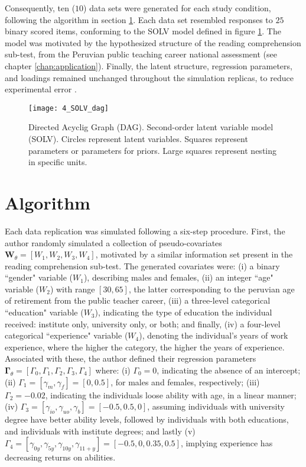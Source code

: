 Consequently, ten ($10$) data sets were generated for each study condition, following the algorithm in section \ref{sect:algorithm}. Each data set resembled responses to $25$ binary scored items, conforming to the SOLV model defined in figure \ref{fig:SOLV_model}. The model was motivated by the hypothesized structure of the reading comprehension sub-test, from the Peruvian public teaching career national assessment (see chapter \ref{chap:application}). Finally, the latent structure, regression parameters, and loadings remained unchanged throughout the simulation replicas, to reduce experimental error \cite{Kieftenbeld_et_al_2012}. 
%
\begin{figure}[h]
	\centering
	\texttt{[image: 4\_SOLV\_dag]}
	\caption[Directed Acyclic Graph (DAG). Second-order latent variable model (SOLV).]%
	{Directed Acyclig Graph (DAG). Second-order latent variable model (SOLV). Circles represent latent variables. Squares represent parameters or parameters for priors. Large squares represent nesting in specific units.}
	\label{fig:SOLV_model}
\end{figure}


\section{Algorithm} \label{sect:algorithm}

Each data replication was simulated following a six-step procedure. First, the author randomly simulated a collection of pseudo-covariates $\mathbf{W}_{\theta} = [ W_{1}, W_{2}, W_{3}, W_{4} ]$, motivated by a similar information set present in the reading comprehension sub-test. The generated covariates were: (i) a binary ``gender" variable ($W_{1}$), describing males and females, (ii) an integer ``age" variable ($W_{2}$) with range $[30, 65]$, the latter corresponding to the peruvian age of retirement from the public teacher career, (iii) a three-level categorical ``education" variable ($W_{3}$), indicating the type of education the individual received: institute only, university only, or both; and finally, (iv) a four-level categorical ``experience" variable ($W_{4}$), denoting the individual's years of work experience, where the higher the category, the higher the years of experience. Associated with these, the author defined their regression parameters $\mathbf{\Gamma}_{\theta} = [\Gamma_{0}, \Gamma_{1}, \Gamma_{2}, \Gamma_{3}, \Gamma_{4}]$ where: (i) $\Gamma_{0} = 0$, indicating the absence of an intercept; (ii) $\Gamma_{1} = [\gamma_{m}, \gamma_{f}] = [0, 0.5]$, for males and females, respectively; (iii) $\Gamma_{2} = -0.02$, indicating the individuals loose ability with age, in a linear manner; (iv) $\Gamma_{3} = [\gamma_{io}, \gamma_{uo}, \gamma_{b}] = [-0.5, 0.5, 0]$, assuming individuals with university degree have better ability levels, followed by individuals with both educations, and individuals with institute degrees; and lastly (v) $\Gamma_{4} = [\gamma_{0y}, \gamma_{5y}, \gamma_{10y}, \gamma_{11+y}] = [-0.5, 0, 0.35, 0.5]$, implying experience has decreasing returns on abilities.

